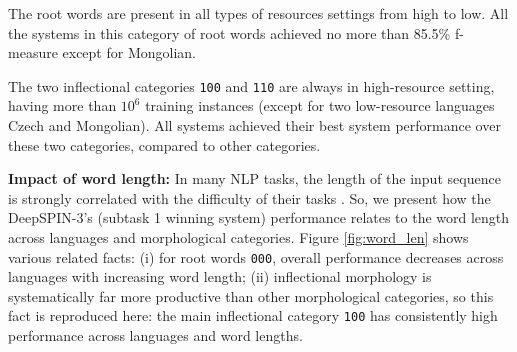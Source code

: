 \documentclass[11pt]{article}
\begin{document}
The root words are present in all types of resources settings from high to low. All the systems in this category of root words achieved no more than 85.5\% f-measure except for Mongolian. 

The two inflectional categories \texttt{100} and \texttt{110} are always in high-resource setting, having more than $10^6$ training instances (except for two low-resource languages Czech and Mongolian). All systems achieved their best system performance over these two categories, compared to other categories.

\vspace{1em} \noindent \textbf{Impact of word length:} 
In many NLP tasks, the length of the input sequence is strongly correlated with the difficulty of their tasks \cite{yin2017comparative,wu2018phrase}. So, we present how the DeepSPIN-3's (subtask 1 winning system) performance relates to the word length across languages and morphological categories. Figure \ref{fig:word_len} shows various related facts: (i) for root words \texttt{000}, overall performance decreases across languages with increasing word length; (ii) inflectional morphology is systematically far more productive than other morphological categories, so this fact is reproduced here: the main inflectional category \texttt{100} has consistently high performance across languages and word lengths. 
\end{document}

